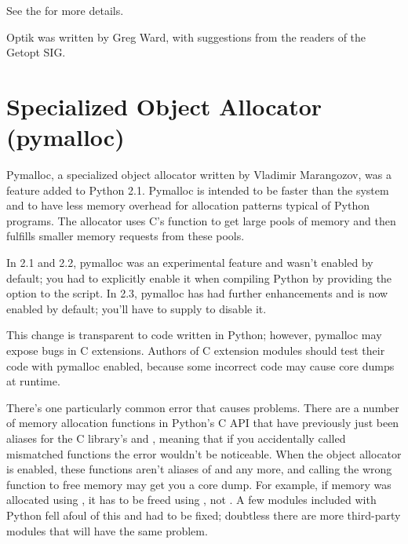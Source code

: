 \documentclass{howto}
\begin{document}
See the 
for more details.

Optik was written by Greg Ward, with suggestions from the readers of
the Getopt SIG.


\section{Specialized Object Allocator (pymalloc)\label{section-pymalloc}}

Pymalloc, a specialized object allocator written by Vladimir
Marangozov, was a feature added to Python 2.1.  Pymalloc is intended
to be faster than the system  and to have less
memory overhead for allocation patterns typical of Python programs.
The allocator uses C's  function to get large
pools of memory and then fulfills smaller memory requests from these
pools.

In 2.1 and 2.2, pymalloc was an experimental feature and wasn't
enabled by default; you had to explicitly enable it when compiling
Python by providing the
 option to the 
script.  In 2.3, pymalloc has had further enhancements and is now
enabled by default; you'll have to supply
 to disable it.

This change is transparent to code written in Python; however,
pymalloc may expose bugs in C extensions.  Authors of C extension
modules should test their code with pymalloc enabled,
because some incorrect code may cause core dumps at runtime.  

There's one particularly common error that causes problems.  There are
a number of memory allocation functions in Python's C API that have
previously just been aliases for the C library's 
and , meaning that if you accidentally called
mismatched functions the error wouldn't be noticeable.  When the
object allocator is enabled, these functions aren't aliases of
 and  any more, and calling the
wrong function to free memory may get you a core dump.  For example,
if memory was allocated using , it has to
be freed using , not .  A
few modules included with Python fell afoul of this and had to be
fixed; doubtless there are more third-party modules that will have the
same problem.
\end{document}
